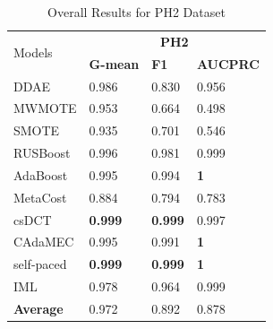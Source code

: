 \begin{table}[h]
    \centering
    \begin{tabular}{|p{}<{\centering}|p{}<{\centering}|p{}<{\centering}|p{}<{\centering}|}
    \hline
    \multirow{2}{*}{Models} & \multicolumn{3}{c|}{\textbf{PH2}}    \\ \cline{2-4} 
                             & \textbf{G-mean} & \textbf{F1} & \textbf{AUCPRC} \\ \hline
    DDAE                     & 0.986	&0.830	&0.956               \\ \hline
    MWMOTE                   &0.953	&0.664	&0.498               \\ \hline
    SMOTE                    & 0.935	&0.701	&0.546               \\ \hline
    RUSBoost                 &0.996	&0.981	&0.999              \\ \hline
    AdaBoost                 & 0.995	&0.994	&\textbf{1}                \\ \hline
    MetaCost                 & 0.884	&0.794	&0.783               \\ \hline
    csDCT                    & \textbf{0.999}	&\textbf{0.999}	&0.997                \\ \hline
    CAdaMEC                  & 0.995	&0.991	&\textbf{1}               \\ \hline
    self-paced               & \textbf{0.999}	&\textbf{0.999}	&\textbf{1}                 \\ \hline
    IML                      & 0.978	&0.964	&0.999              \\ \hline\hline
    \textbf{Average}         & 0.972	&0.892	&0.878                 \\ \hline
    \end{tabular}
    \vspace{-8pt}
    \caption{Overall Results for PH2 Dataset}
    \label{tab11}
\end{table}
